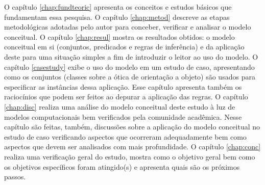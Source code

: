 O capítulo \ref{chap:fundteoric} apresenta os conceitos e estudos básicos que fundamentam essa pesquisa. O capítulo \ref{chap:metod} descreve as etapas metodológicas adotadas pelo autor para conceber, verificar e analisar o modelo conceitual. O capítulo \ref{chap:resul} mostra os resultados obtidos: o modelo conceitual em si (conjuntos, predicados e regras de inferência) e da aplicação deste para uma situação simples a fim de introduzir o leitor ao uso do modelo. O capítulo \ref{casestudy} exibe o uso do modelo em um estudo de caso, apresentando como os conjuntos (classes sobre a ótica de orientação a objeto) são usados para especificar as instâncias dessa aplicação. Esse capítulo apresenta também os raciocínios que podem ser feitos ao depurar a aplicação das regras. O capítulo \ref{chap:disc} realiza uma análise do modelo conceitual deste estudo à luz de modelos computacionais bem verificados pela comunidade acadêmica. Nesse capítulo são feitas, também, discussões sobre a aplicação do modelo conceitual no estudo de caso verificando aspectos que ocorreram adequadamente bem como aspectos que devem ser analisados com mais profundidade. O capítulo \ref{chap:conc} realiza uma verificação geral do estudo, mostra como o objetivo geral bem como os objetivos específicos foram atingido(s) e apresenta quais são os próximos passos. 